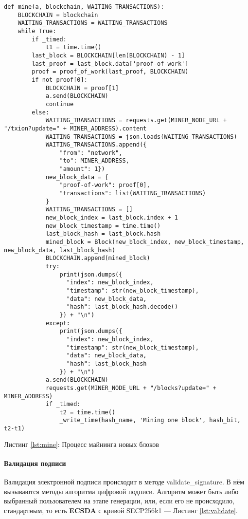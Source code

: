 \begin{center}
\begin{lstlisting}
def mine(a, blockchain, WAITING_TRANSACTIONS):
    BLOCKCHAIN = blockchain
    WAITING_TRANSACTIONS = WAITING_TRANSACTIONS
    while True:
        if _timed:
            t1 = time.time()
        last_block = BLOCKCHAIN[len(BLOCKCHAIN) - 1]
        last_proof = last_block.data['proof-of-work']
        proof = proof_of_work(last_proof, BLOCKCHAIN)
        if not proof[0]:
            BLOCKCHAIN = proof[1]
            a.send(BLOCKCHAIN)
            continue
        else:
            WAITING_TRANSACTIONS = requests.get(MINER_NODE_URL + "/txion?update=" + MINER_ADDRESS).content
            WAITING_TRANSACTIONS = json.loads(WAITING_TRANSACTIONS)
            WAITING_TRANSACTIONS.append({
                "from": "network",
                "to": MINER_ADDRESS,
                "amount": 1})
            new_block_data = {
                "proof-of-work": proof[0],
                "transactions": list(WAITING_TRANSACTIONS)
            }
            WAITING_TRANSACTIONS = []
            new_block_index = last_block.index + 1
            new_block_timestamp = time.time()
            last_block_hash = last_block.hash
            mined_block = Block(new_block_index, new_block_timestamp, new_block_data, last_block_hash)
            BLOCKCHAIN.append(mined_block)
            try:
                print(json.dumps({
                  "index": new_block_index,
                  "timestamp": str(new_block_timestamp),
                  "data": new_block_data,
                  "hash": last_block_hash.decode()
                }) + "\n")
            except:
                print(json.dumps({
                  "index": new_block_index,
                  "timestamp": str(new_block_timestamp),
                  "data": new_block_data,
                  "hash": last_block_hash
                }) + "\n")
            a.send(BLOCKCHAIN)
            requests.get(MINER_NODE_URL + "/blocks?update=" + MINER_ADDRESS)
            if _timed:
                t2 = time.time()
                _write_time(hash_name, 'Mining one block', hash_bit, t2-t1)
\end{lstlisting}\label{lst:mine}
    Листинг \ref{lst:mine}: Процесс майнинга новых блоков
\end{center}


\paragraph{Валидация подписи}
Валидация электронной подписи происходит в методе {\small validate\_signature}.
В нём вызываются методы алгоритма цифровой подписи. Алгоритм может быть либо
выбранный пользователем на этапе генерации, или, если его не происходило,
стандартным, то есть \textbf{ECSDA} с кривой  SECP256k1 --- Листинг
\ref{lst:validate}.


